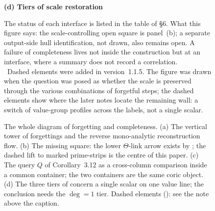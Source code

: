 \documentclass[11pt]{article}
\theoremstyle{plain}
\theoremstyle{definition}
\theoremstyle{remark}
\begin{document}
\begin{figure}[p]
\vspace{0.9\baselineskip}
\begin{minipage}{\textwidth}
\textbf{\small (d) Tiers of scale restoration \cite[Thm.~6.4]{FrdI}}\par\smallskip
\centering
{}
\end{minipage}

\vspace{0.7\baselineskip}
{\footnotesize\raggedright
The status of each interface is listed in the table of \S6. What this figure says: the scale-controlling open square is panel~(b); a separate output-side
hull identification, not drawn, also remains open. A failure of completeness lives not inside the
construction but at an interface, where a summary does not record a correlation.\\[3pt]
\dag\ Dashed elements were added in version~1.1.5. The figure was drawn when the question was
posed as whether the scale is preserved through the various combinations of forgetful steps; the
dashed elements show where the later notes \cite{UCA,UPI} locate the remaining wall: a switch of
value-group profiles across the labels, not a single scalar.\par}

\caption{The whole diagram of forgetting and completeness.
(a) The vertical tower of forgettings and the reverse
mono-analytic reconstruction flow. (b) The missing square: the
lower $\Theta$-link arrow exists by \cite[Def.~3.8(ii)]{IUT3}; the
dashed lift to marked prime-strips is the centre of this paper.
(c) The query $Q$ of Corollary~3.12 as a cross-column comparison
inside a common container; the two containers are the same coric
object. (d) The three tiers of \cite[Thm.~6.4]{FrdI} concern a single
scalar on one value line; the conclusion needs the $\deg=1$ tier.
Dashed elements (\dag): see the note above the caption.}
\label{fig:whole}
\end{figure}
\end{document}
